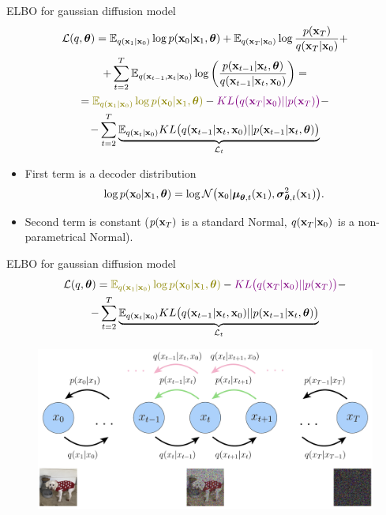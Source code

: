 \begin{frame}{ELBO for gaussian diffusion model}
		\vspace{-0.5cm}
		\begin{multline*}
			\cL(q, \btheta) = \bbE_{q(\bx_1 | \bx_0)} \log p(\bx_0 | \bx_1, \btheta) + \bbE_{q(\bx_T | \bx_0)} \log \frac{p(\bx_T)}{q(\bx_T | \bx_0)} + \\
			  + \sum_{t=2}^T \bbE_{q(\bx_{t-1}, \bx_t | \bx_0)} \log \left( \frac{p(\bx_{t-1} | \bx_t, \btheta)}{q(\bx_{t-1}|\bx_{t}, \bx_0)}\right) =
			  \\ =  {\color{olive}\bbE_{q(\bx_1 | \bx_0)} \log p(\bx_0 | \bx_1, \btheta)} - {\color{violet}KL\bigl(q(\bx_T | \bx_0) || p(\bx_T)\bigr)} - \\
			- \sum_{t=2}^T \underbrace{ \bbE_{q(\bx_t | \bx_0)} KL \bigl(q(\bx_{t-1} | \bx_t, \bx_0) || p(\bx_{t - 1} | \bx_t, \btheta )\bigr)}_{\cL_t}
		\end{multline*}
		\vspace{-0.5cm}
	\begin{itemize}
		\item {\color{olive}First term} is a decoder distribution
		\[
			\log p(\mathbf{x}_0 | \mathbf{x}_1, \boldsymbol{\theta}) = \log \mathcal{N} \bigl(\mathbf{x}_0 | \boldsymbol{\mu}_{\boldsymbol{\theta}, t}(\mathbf{x}_1), \boldsymbol{\sigma}_{\boldsymbol{\theta}, t}^2(\mathbf{x}_1)\bigr).
		\] 
		\item {\color{violet}Second term} is constant ($p(\mathbf{x}_T)$ is a standard Normal, $q(\mathbf{x}_T | \mathbf{x}_0)$ is a non-parametrical Normal).
	\end{itemize}
\end{frame}
\begin{frame}{ELBO for gaussian diffusion model}
	\vspace{-0.5cm}
	\begin{multline*}
		\cL(q, \btheta) =  {\color{olive}\bbE_{q(\bx_1 | \bx_0)} \log p(\bx_0 | \bx_1, \btheta)} - {\color{violet}KL\bigl(q(\bx_T | \bx_0) || p(\bx_T)\bigr)} - \\
		- \sum_{t=2}^T \underbrace{ \bbE_{q(\bx_t | \bx_0)} KL \bigl(q(\bx_{t-1} | \bx_t, \bx_0) || p(\bx_{t - 1} | \bx_t, \btheta )\bigr)}_{\cL_t}
	\end{multline*}
	
	\begin{figure}
		\includegraphics[width=0.85\linewidth]{figs/diffusion_objective}
	\end{figure}

\end{frame}

